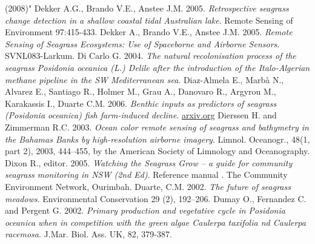 \documentclass[11pt]{article}
\begin{document}
\begin{thebibliography}{999}
(2008)" \pageref{Dehouck08}
Dekker A.G., Brando V.E., Anstee J.M. 2005. \emph{Retrospective seagrass change detection in a shallow coastal tidal Australian lake}. Remote Sensing of Environment 97:415-433. \pageref{Dekker05a}
Dekker A., Brando V.E., Anstee J.M. 2005. \emph{Remote Sensing of Seagrass Ecosystems: Use of Spaceborne and Airborne Sensors}. SVNL083-Larkum. \pageref{05b}
Di Carlo G. 2004. \emph{The natural recolonisation process of the seagrass Posidonia
oceanica (L.) Delile after the introduction of the Italo-Algerian methane pipeline in the SW
Mediterranean sea}.\pageref{DiCarlo04}
Diaz-Almela E., Marb\`a N., Alvarez E., Santiago R., Holmer M., Grau A., Danovaro R., Argyrou M., Karakassis I., Duarte C.M. 2006. \emph{Benthic inputs as predictors of seagrass (\textit{Posidonia oceanica}) fish farm-induced decline}. \href{http://arxiv.org/ftp/qbio/papers/0611/0611006.pdf}{arxiv.org} \pageref{Diaz-Almela06}
Dierssen H. and Zimmerman R.C. 2003. \emph{Ocean color remote sensing of seagrass and
bathymetry in the Bahamas Banks by high-resolution airborne imagery}. Limnol. Oceanogr.,
48(1, part 2), 2003, 444–455, by the American Society of Limnology and Oceanography. \pageref{Dierssen03}
Dixon R., editor. 2005. \emph{Watching the Seagrass Grow – a guide for community seagrass
monitoring in NSW (2nd Ed)}. Reference manual . The Community Environment Network,
Ourimbah. \pageref{Dixon05}
Duarte, C.M. 2002. \emph{The future of seagrass meadows}. Environmental Conservation 29 (2), 192–206. \pageref{Duarte02}
Dumay O., Fernandez C. and Pergent G. 2002. \emph{Primary production and vegetative cycle in \textit{Posidonia oceanica} when in competition with the green algae Caulerpa taxifolia nd
Caulerpa racemosa}. J.Mar. Biol. Ass. UK, 82, 379-387. \pageref{Dumay02}

\end{thebibliography}
\end{document}
